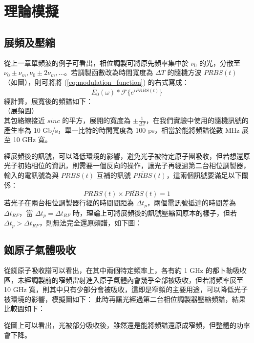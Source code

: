 \documentclass[class=NCU_thesis, crop=false]{standalone}
\begin{document}
\chapter{理論模擬}
\section{展頻及壓縮}
從上一章單頻波的例子可看出，相位調製可將原先頻率集中於 $\nu_{0}$ 的光，分散至 $\nu_{0}\pm\nu_{m}, \nu_{0}\pm2\nu_{m},\dots$。若調製函數改為時間寬度為 $\Delta T$ 的隨機方波 $PRBS(t)$ （如圖），則可將將 (\ref{eq:modulation_function}) 的右式寫成：
\begin{equation}
    \tilde{E_{0}}(\omega)*\mathscr{F}\{{e^{i PRBS(t)}}\}
\end{equation}
經計算，展寬後的頻譜如下：\\
（展頻圖）\\
其包絡線接近 $sinc$ 的平方，展開的寬度為 $\pm\frac{1}{\Delta T}$，在我們實驗中使用的隨機訊號的產生率為 10 Gb/s，單一比特的時間寬度為 100 ps，相當於能將頻譜從數 MHz 展至 10 GHz 寬。

經展頻後的訊號，可以降低環境的影響，避免光子被特定原子團吸收，但若想還原光子初始相位的資訊，則需要一個反向的操作，讓光子再經過第二台相位調製器，輸入的電訊號為與 $PRBS(t)$ 互補的訊號 $\overline{PRBS}(t)$，這兩個訊號要滿足以下關係：
\begin{equation}
    PRBS(t)\times \overline{PRBS}(t)=1
\end{equation}
若光子在兩台相位調製器行經的時間間距為 $\Delta t_{p}$，兩個電訊號抵達的時間差為 $\Delta t_{RF}$，當 $\Delta t_{p}=\Delta t_{RF}$ 時，理論上可將展頻後的訊號壓縮回原本的樣子，但若 $\Delta t_{p}>\Delta t_{RF}$，則無法完全還原頻譜，如下圖：

\section{銣原子氣體吸收}
從銣原子吸收譜可以看出，在其中兩個特定頻率上，各有約 1 GHz 的都卜勒吸收區，未經調製前的窄頻雷射進入原子氣體內會幾乎全部被吸收，但若將頻率展至 10 GHz 寬，則其中只有少部分會被吸收，這即是窄頻的主要用途，可以降低光子被環境的影響，模擬圖如下：
此時再讓光經過第二台相位調製器壓縮頻譜，結果比較圖如下：

從圖上可以看出，光被部分吸收後，雖然還是能將頻譜還原成窄頻，但整體的功率會下降。
\end{document}
